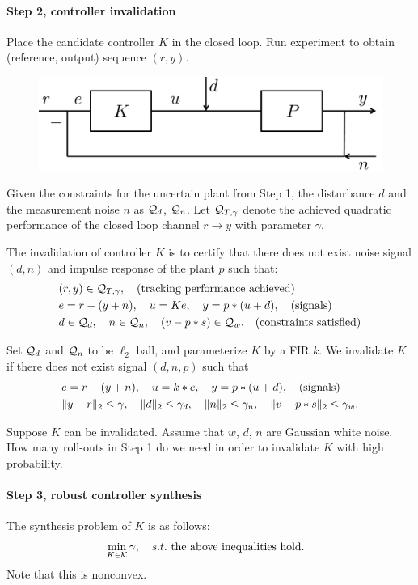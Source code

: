 \documentclass[11pt, onecolumn]{article}
\newcommand{\qq}[1]{{\color{magenta}{(#1)}}}
\begin{document}
\paragraph{Step 2, controller invalidation}

Place the candidate controller $K$ in the closed loop. Run experiment to obtain (reference, output)
sequence $(r, y)$.
\begin{figure}[!ht]
  \centering
  \includegraphics[width=.5\linewidth]{sys2.pdf}
\end{figure}

Given the constraints for the uncertain plant from Step 1, the disturbance $d$ and the measurement
noise $n$ as $\mathcal Q_d$, $\mathcal Q_n$. Let $\mathcal Q_{T,\gamma}$ denote the achieved quadratic performance
of the closed loop channel $r\to y$ with parameter $\gamma$.

The invalidation of controller $K$ is to certify that there does not exist noise signal $(d, n)$ and
impulse response of the plant $p$ such that:
\begin{align*}
  & (r,y)\in\mathcal Q_{T,\gamma}, \quad\text{(tracking performance achieved)}
  \\
  & e = r-(y+n), \quad u = K e, \quad y = p * (u+d),  \quad\text{(signals)}
  \\
  & d\in\mathcal Q_d, \quad n\in\mathcal Q_n,  \quad (v-p*s )\in\mathcal Q_w. \quad\text{(constraints satisfied)}
\end{align*}

Set $\mathcal Q_d$ and $\mathcal Q_n$ to be $\ell_2$ ball, and parameterize $K$ by a FIR $k$.  We invalidate $K$
if there does not exist signal $(d, n, p )$ such that
\begin{align*}
  & e = r-(y+n), \quad u = k * e, \quad y = p * (u+d), \quad\text{(signals)}
  \\
  & \|y - r\|_2 \le \gamma, \quad \|d\|_2\le \gamma_d, \quad  \|n\|_2\le \gamma_n, \quad
  \|v-p*s\|_2\le \gamma_w.
\end{align*}
\qq{convex?}


Suppose $K$ can be invalidated. Assume that $w$, $d$, $n$ are Gaussian white noise. How many
roll-outs in Step 1 do we need in order to invalidate $K$ with high probability.


\paragraph{Step 3, robust controller synthesis}
The synthesis problem of $K$ is as follows:
\begin{align*}
  &\min_{K\in\mathcal K} \gamma,\quad s.t. \text{ the above inequalities hold}.
\end{align*}
Note that this is  nonconvex.
\end{document}
